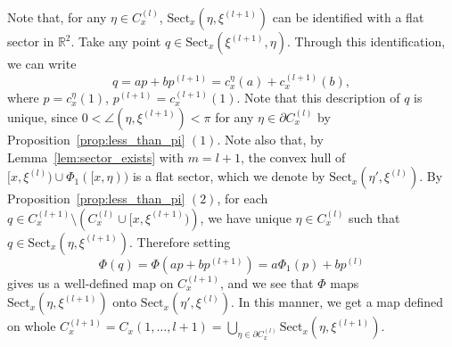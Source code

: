 \documentclass[12pt]{amsart}
\numberwithin{equation}{section}
\theoremstyle{plain}
\theoremstyle{definition}
\theoremstyle{remark}
\newcommand{\R}{{\mathbb R}}
\newcommand{\p}[1]{p^{(#1)}}
\newcommand{\xxi}[1]{\xi^{(#1)}}
\newcommand{\ray}[1]{[#1)}
\newcommand{\cc}[2]{c_{#1}^{#2}}
\newcommand{\sect}[3][]{\mathrm{Sect}_{#1}(#2,#3)}
\newcommand{\cone}[2][]{C_{#1}^{(#2)}}
\begin{document}
 Note that, for any $\eta \in \cone[x]{l}$, 
 $\sect[x]{\eta}{\xxi{l+1}}$ can be identified with a flat
 sector in $\R^2$. 
 Take any point $q \in \sect[x]{\xxi{l+1}}{\eta}$. 
 Through this identification, we can write 
\begin{equation*}
 q=a p + b \p{l+1}= \cc{x}{\eta}(a) + \cc{x}{(l+1)}(b), 
\end{equation*}
 where $p=\cc{x}{\eta}(1)$, $\p{l+1}=\cc{x}{(l+1)}(1)$. 
 Note that this description of $q$ is unique,
 since $0<\angle(\eta,\xxi{l+1})<\pi$ for any 
 $\eta \in \partial \cone[x]{l}$ by
 Proposition~\ref{prop:less_than_pi} $(1)$.
 Note also that, by Lemma~\ref{lem:sector_exists} with $m=l+1$, the
 convex hull of $\ray{x,\xi^{(l)}} \cup \Phi_1(\ray{x,\eta})$ is a
 flat sector, which we denote by $\sect[x]{\eta'}{\xi^{(l)}}$. 
 By Proposition~\ref{prop:less_than_pi} $(2)$,  for each 
 $q \in \cone[x]{l+1}\setminus \left(\cone[x]{l}\cup
 \ray{x,\xxi{l+1}}\right)$, 
 we have unique $\eta \in \cone[x]{l}$ such that 
 $q \in \sect[x]{\eta}{\xxi{l+1}}$. 
 Therefore setting 
\begin{equation*}
 \Phi(q)= \Phi(ap + b \p{l+1})
  = a \Phi_1(p) + b \p{l} 
\end{equation*}
 gives us a well-defined map on $\cone[x]{l+1}$, 
 and we see that $\Phi$ maps 
 $\sect[x]{\eta}{\xxi{l+1}}$ onto $\sect[x]{\eta'}{\xxi{l}}$. 
 In this manner, we get a map defined on whole 
 $\cone[x]{l+1}=C_{x}(1,\dots,l+1)=
 \bigcup_{\eta \in \partial \cone[x]{l}}
 \sect[x]{\eta}{\xxi{l+1}}$. 
\end{document}
